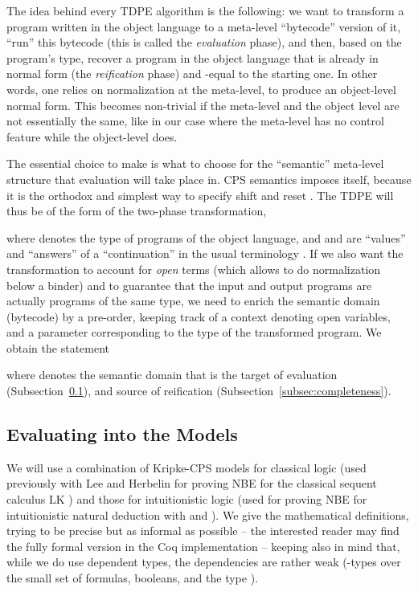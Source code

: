 \documentclass{eptcs}
\theoremstyle{definition}
\theoremstyle{plain}
\theoremstyle{remark}
\begin{document}
The idea behind every TDPE algorithm is the following: we want to transform a program written in the object language to a meta-level ``bytecode'' version of it, ``run'' this bytecode  (this is called the \emph{evaluation} phase), and then, based on the program's type, recover a program in the object language that is already in normal form (the \emph{reification} phase) and -equal to the starting one. In other words, one relies on normalization at the meta-level, to produce an object-level normal form. This becomes non-trivial if the meta-level and the object level are not essentially the same, like in our case where the meta-level has no control feature while the object-level does.

The essential choice to make is what to choose for the ``semantic'' meta-level structure that evaluation will take place in. CPS semantics imposes itself, because it is the orthodox and simplest way to specify shift and reset  \cite{DanvyF1992}. The TDPE will thus be of the form of the two-phase transformation,

where  denotes the type of programs of the object language, and  and  are ``values'' and ``answers'' of a ``continuation'' in the usual terminology \cite{Danvy1999}. If we also want the transformation to account for \emph{open} terms (which allows to do normalization below a binder) and to guarantee that the input and output programs are actually programs of the same type, we need to enrich the  semantic domain (bytecode) by a pre-order, keeping track of a context  denoting open variables, and a parameter  corresponding to the type of the transformed program. 
We obtain the statement

where  denotes the semantic domain that is the target of evaluation (Subsection~\ref{subsec:soundness}), and source of reification (Subsection~\ref{subsec:completeness}). 

\subsection{Evaluating into the Models}\label{subsec:soundness}

We will use a combination of Kripke-CPS models for classical logic (used previously with Lee and Herbelin for proving NBE for the classical sequent calculus LK \cite{IlikLH2010}) and those for intuitionistic logic (used for proving NBE for intuitionistic natural deduction with  and  \cite{Ilik2011}). We give the mathematical definitions, trying to be precise but as informal as possible -- the interested reader may find the fully formal version in the Coq implementation -- keeping also in mind that, while we do use dependent types, the dependencies are rather weak (-types over the small set of formulas, booleans, and the type ).
\end{document}

